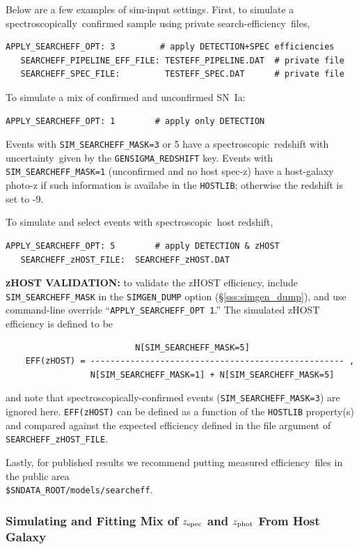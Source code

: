 \documentclass[12pt]{article}
\newcommand{\unc}{uncertainty}
\newcommand{\Zphot}{z_{\rm phot}}
\newcommand{\Zspec}{z_{\rm spec}}
\newcommand{\eff}{efficiency}
\newcommand{\spec}{spectroscopic}
\newcommand{\specy}{spectroscopically}
\begin{document}
{%
Below are a few examples of sim-input settings.
First, to simulate a \specy\ confirmed sample
using private search-\eff\ files,
%
\begin{Verbatim}[frame=single]
   APPLY_SEARCHEFF_OPT: 3         # apply DETECTION+SPEC efficiencies
   SEARCHEFF_PIPELINE_EFF_FILE: TESTEFF_PIPELINE.DAT  # private file
   SEARCHEFF_SPEC_FILE:         TESTEFF_SPEC.DAT      # private file
\end{Verbatim}
%
To simulate a mix of confirmed and unconfirmed SN~Ia:
%
\begin{Verbatim}[frame=single]
   APPLY_SEARCHEFF_OPT: 1        # apply only DETECTION
\end{Verbatim}
Events with \verb|SIM_SEARCHEFF_MASK=3| or 5 have a \spec\ redshift
with \unc\ given by the \verb|GENSIGMA_REDSHIFT| key.
Events with \verb|SIM_SEARCHEFF_MASK=1| 
(unconfirmed and no host spec-z) have a host-galaxy photo-z
if such information is availabe in the {\tt HOSTLIB};
otherwise the redshift is set to -9.

\bigskip\noindent
To simulate and select events with \spec\ host redshift,
\begin{Verbatim}[frame=single]
   APPLY_SEARCHEFF_OPT: 5        # apply DETECTION & zHOST
   SEARCHEFF_zHOST_FILE:  SEARCHEFF_zHOST.DAT
\end{Verbatim}

{\bf zHOST VALIDATION:}
to validate the zHOST efficiency, include \verb|SIM_SEARCHEFF_MASK| in the
\verb|SIMGEN_DUMP| option (\S\ref{sss:simgen_dump}), 
and use command-line override  ``\verb|APPLY_SEARCHEFF_OPT 1|.'' 
The simulated zHOST efficiency is defined to be
\begin{verbatim}
                          N[SIM_SEARCHEFF_MASK=5]
    EFF(zHOST) = --------------------------------------------------- ,
                 N[SIM_SEARCHEFF_MASK=1] + N[SIM_SEARCHEFF_MASK=5] 
\end{verbatim}
and note that spectroscopically-confirmed events (\verb|SIM_SEARCHEFF_MASK=3|)
are ignored here.
{\tt EFF(zHOST)} can be defined as a function of the {\tt HOSTLIB}
property(s) and compared against the expected efficiency defined
in the file argument of {\tt SEARCHEFF\_zHOST\_FILE}.


\bigskip\noindent
Lastly, for published results we recommend putting measured \eff\ 
files in the public area \\ {\tt \$SNDATA\_ROOT/models/searcheff}.

  \clearpage
   \subsubsection{Simulating and Fitting Mix of $\Zspec$ and $\Zphot$ From Host Galaxy}
   \label{sssec:sim_zmix}

}
\end{document}
